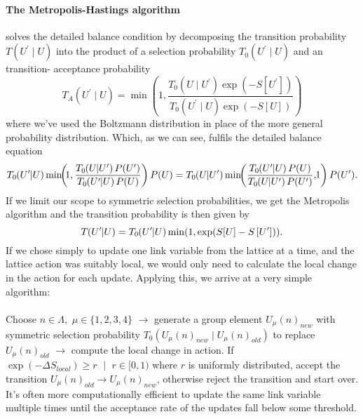 \documentclass[a4paper,10pt]{article}
\begin{document}
\paragraph{The Metropolis-Hastings algorithm} solves the detailed balance condition by decomposing the transition probability $T\left(U^{\prime} \mid U\right)$ into the product of a selection probability $T_0\left(U^{\prime} \mid U\right)$ and an transition- acceptance probability
\begin{equation}
T_{A}\left(U^{\prime} \mid U\right)=\min \left(1, \frac{T_{0}\left(U \mid U^{\prime}\right) \exp \left(-S\left[U^{\prime}\right]\right)}{T_{0}\left(U^{\prime} \mid U\right) \exp (-S[U])}\right)
\end{equation}
where we've used the Boltzmann distribution in place of the more general probability distribution. Which, as we can see, fulfils the detailed balance equation
\begin{equation*}
T_0\mkern-4mu\left(U^{\prime}\mkern-6mu \mid\mkern-5mu U\right)\min\mkern-6mu \left(\mkern-4mu 1, \frac{T_0\mkern-4mu\left(U\mkern-6mu \mid\mkern-5mu U^{\prime}\right) P(U^\prime)}{T_0\mkern-4mu\left(U^{\prime}\mkern-6mu \mid\mkern-5mu U\right) P(U)}\right)P(U) = T_0\mkern-4mu\left(U\mkern-6mu \mid\mkern-5mu U^{\prime}\right)\min\mkern-6mu \left(\frac{T_0\mkern-4mu\left(U^{\prime}\mkern-6mu \mid\mkern-5mu U\right) P(U)}{T_0\mkern-4mu\left(U\mkern-6mu \mid\mkern-5mu U^{\prime}\right) P(U^{\prime})},\mkern-4mu 1\right)P(U^{\prime}).
\end{equation*}
If we limit our scope to symmetric selection probabilities, we get the Metropolis algorithm and the transition probability is then given by 
\begin{equation}
T\mkern-4mu\left(U^{\prime}\mkern-6mu \mid\mkern-5mu U\right) = T_0\mkern-4mu\left(U^{\prime}\mkern-6mu \mid\mkern-5mu U\right)\min (1, \exp (S[U]-S\left[U^{\prime}\right])).
\end{equation}
If we chose simply to update one link variable from the lattice at a time, and the lattice action was suitably local, we would only need to calculate the local change in the action for each update. Applying this, we arrive at a very simple algorithm:\\\\Choose $n\in\Lambda,\,\,\mu \in\{1,2,3,4\}$ $\rightarrow$ generate a group element $U_\mu(n)_{new}$ with symmetric selection probability $T_0\left( U_\mu(n)_{new} \mid U_\mu(n)_{old} \right)$ to replace $U_\mu(n)_{old}$ $\rightarrow$ compute the local change in action. If $\exp (-\Delta S_{local})\geq r\,\,\mid\,\,r\in[0,1)$ where $r$ is uniformly distributed, accept the transition $U_\mu(n)_{old} \rightarrow U_\mu(n)_{new}$, otherwise reject the transition and start over.\\It's often more computationally efficient to update the same link variable multiple times until the acceptance rate of the updates fall below some threshold.
\end{document}
